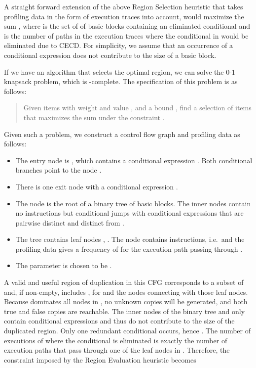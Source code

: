 \documentclass[halfparskip]{scrartcl}
\begin{document}
A straight forward extension of the above Region Selection heuristic that takes profiling data in the form of execution traces into account, would maximize the sum , where  is the set of of basic blocks containing an eliminated conditional and  is the number of paths in the execution traces where the conditional in  would be eliminated due to CECD. For simplicity, we assume that an occurrence of a conditional expression does not contribute to the size  of a basic block.

If we have an algorithm that selects the optimal region, we can solve the 0-1 knapsack problem, which is -complete. The specification of this problem is as follows:
\begin{quote}
Given  items with weight  and value ,  and a bound , find a selection of items  that maximizes the sum  under the constraint .
\end{quote}
Given such a problem, we construct a control flow graph and profiling data as follows:
\begin{itemize}
\item The entry node is , which contains a conditional expression . Both conditional branches point to the node .
\item There is one exit node  with a conditional expression .
\item The node  is the root of a binary tree of basic blocks. The inner nodes contain no instructions but conditional jumps with conditional expressions that are pairwise distinct and distinct from .
\item The tree contains  leaf nodes , . The node  contains  instructions, i.e.\  and the profiling data gives a frequency of  for the execution path passing through .
\item The parameter  is chosen to be .
\end{itemize}

A valid and useful region of duplication  in this CFG corresponds to a subset of  and, if non-empty, includes ,  for  and the nodes connecting  with those leaf nodes. Because  dominates all nodes in , no unknown copies will be generated, and both true and false copies are reachable. The inner nodes of the binary tree and  only contain conditional expressions and thus do not contribute to the size of the duplicated region. Only one redundant conditional occurs, hence . The number of executions of  where the conditional is eliminated is exactly the number of execution paths that pass through one of the leaf nodes in . Therefore, the constraint imposed by the Region Evaluation heuristic becomes
\end{document}

